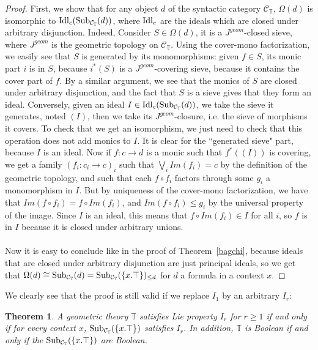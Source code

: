 \documentclass{article}
\newtheorem{theorem}{Theorem}
\newcommand{\T}{\mathbb{T}}
\begin{document}
\begin{proof}
    First, we show that for any object $d$ of the syntactic category $\mathcal{C}_\T$, $\Omega(d)$ is isomorphic to $\textup{Idl}_c(\textup{Sub}_{\mathcal{C}_\mathbb{T}}(d))$, where $\textup{Idl}_c$ are the ideals which are closed under arbitrary disjunction. Indeed, Consider $S\in\Omega(d)$, it is a $J^{geom}$-closed sieve, where $J^{geom}$ is the geometric topology on $\mathcal{C}_\T$. Using the cover-mono factorization, we easily see that $S$ is generated by its monomorphisms: given $f\in S$, its monic part $i$ is in $S$, because $i^*(S)$ is a $J^{geom}$-covering sieve, because it contains the cover part of $f$. By a similar argument, we see that the monics of $S$ are closed under arbitrary disjunction, and the fact that $S$ is a sieve gives that they form an ideal. Conversely, given an ideal $I\in \textup{Idl}_c(\textup{Sub}_{\mathcal{C}_\mathbb{T}}(d))$, we take the sieve it generates, noted $(I)$, then we take its $J^{geom}$-closure, i.e. the sieve of morphisms it covers. To check that we get an isomorphism, we just need to check that this operation does not add monics to $I$. It is clear for the ``generated sieve" part, because $I$ is an ideal. Now if $f:c\xrightarrow{}d$ is a monic such that $f^*((I))$ is covering, we get a family $(f_i:c_i\xrightarrow{}c)_i$ such that $\bigvee_{i}Im(f_i)=c$ by the definition of the geometric topology, and such that each $f\circ f_i$ factors through some $g_i$ a monomorphism in $I$. But by uniqueness of the cover-mono factorization, we have that $Im(f\circ f_i)=f\circ Im(f_i)$, and $Im(f\circ f_i)\leq g_i$ by the universal property of the image. Since $I$ is an ideal, this means that $f\circ Im(f_i)\in I$ for all $i$, so $f$ is in $I$ because it is closed under arbitrary unions.\\
    \\
    Now it is easy to conclude like in the proof of Theorem~\ref{bagchi}, because ideals that are closed under arbitrary disjunction are just principal ideals, so we get that $\Omega(d)\cong \textup{Sub}_{\mathcal{C}_\mathbb{T}}(d)=\textup{Sub}_{\mathcal{C}_\mathbb{T}}(\{x.\top\})_{\leq d}$ for $d$ a formula in a context $x$.
\end{proof}

    We clearly see that the proof is still valid if we replace $I_1$ by an arbitrary $I_r$: 
\begin{theorem}
    A geometric theory $\mathbb{T}$ satisfies Lie property $I_r$ for $r\geq 1$ if and only if for every context $x$, $\textup{Sub}_{\mathcal{C}_\mathbb{T}}(\{x.\top\})$ satisfies $I_r$. In addition, $\T$ is Boolean if and only if the $\textup{Sub}_{\mathcal{C}_\mathbb{T}}(\{x.\top\})$ are Boolean.
\end{theorem}
\end{document}
